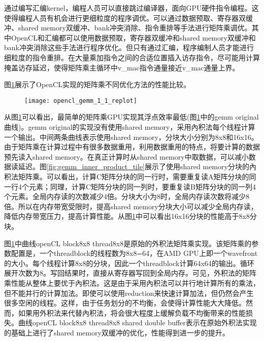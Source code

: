 通过编写汇编kernel，编程人员可以直接跳过编译器，面向GPU硬件指令编程。这使得编程人员有机会进行更细粒度的程序调优。可以通过数据预取、寄存器双缓冲、shared memory双缓冲、bank冲突消除、指令重排等手法进行矩阵乘调优。其中OpenCL和汇编都可以使用数据预取，寄存器双缓冲和shared memory双缓冲和bank冲突消除这些手法进行程序优化。但只有通过汇编，程序编制人员才能进行细粒度的指令重排。在大量乘加指令之间的合适位置插入访存指令，尽可能用计算掩盖访存延迟，使得矩阵乘主循环中v\_mac指令通量接近v\_mac通量上界。

图\ref{fig:opencl_gemm_1_1_replot}展示了OpenCL实现的矩阵乘不同优化方法的性能比较。

\begin{figure}[htbp]
	\centering
	\texttt{[image: opencl\_gemm\_1\_1\_replot]}
	\label{fig:opencl_gemm_1_1_replot}
\end{figure}

从图\ref{fig:opencl_gemm_1_1_replot}可以看出，最简单的矩阵乘GPU实现其浮点效率最低(图\ref{fig:opencl_gemm_1_1_replot}中的gemm original曲线)。gemm original的实现没有使用shared memory，采用內积法每个线程计算一个输出。中间两条曲线表示使用shared memory，分块大小分别为8x8和16x16。由于矩阵乘在计算过程中有很多数据重用，利用数据重用的特点，将要计算的数据预先读入shared memory。在真正计算时从shared memory中取数据，可以减小数据读延迟。图\ref{fig:gemm_inner_product_tile}展示了使用shared memory分块的內积法矩阵乘。可以看出，计算C矩阵分块的同一行时，需要重复读A矩阵分块的同一行4个元素；同理，计算C矩阵分块的同一列时，要重复读B矩阵分块的同一列4个元素。全局内存读的次数减少4倍。分块大小为8时，全局内存读次数将减少8倍。所以在内存带宽受限时，提高shared memory分块大小可以减少全局内存读，降低内存带宽压力，提高计算性能。从图\ref{fig:opencl_gemm_1_1_replot}中可以看出16x16分块的性能高于8x8分块。

图\ref{fig:opencl_gemm_1_1_replot}中曲线openCL block8x8 thread8x8是原始的外积法矩阵乘实现。该矩阵乘的参数配置是，一个threadblock的线程数为8x8=64，在AMD GPU上即一个wavefront的大小。每个线程计算8x8的分块，因此一个threadblock计算64x64的输出。循环展开次数为8。写回结果时，直接从寄存器写回到全局内存。可见，外积法的矩阵乘性能从整体上要优于內积法。这是由于采用內积法可以并行地计算所有的乘法，但不能并行的计算加法。即使可以使用reduction来快速计算加法，但仍然会产生很多空闲的线程。这样，由于任务划分的不均衡，会使得计算性能大大降低。然而，如果用外积法来代替內积法，将会很大程度上缓解负载不均衡带来的性能损失。曲线openCL block8x8 thread8x8 shared double buffer表示在原始外积法实现的基础上进行了shared memory双缓冲的优化，性能得到进一步的提升。

